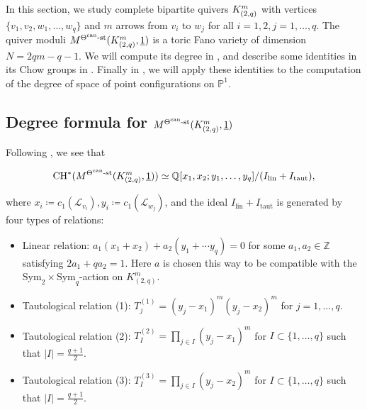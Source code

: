 \documentclass[11pt]{article}
\begin{document}
In this section, we study complete bipartite quivers \(K_{(2,q)}^m\) with vertices \(\{v_1, v_2, w_1, \dots, w_q\}\) and \(m\) arrows from \(v_i\) to \(w_j\) for all \(i = 1, 2, j = 1, \dots, q\). The quiver moduli \(M^{\Theta^{\text{can}}\text{-st}}(K_{(2,q)}^m, \underline{1})\) is a toric Fano variety of dimension \(N = 2qm - q - 1\). We will compute its degree in , and describe some identities in its Chow groups in . Finally in , we will apply these identities to the computation of the degree of space of point configurations on \(\mathbb{P}^1\). 

\subsection{Degree formula for \texorpdfstring{\(M^{\Theta^{\text{can}}\text{-st}}(K_{(2,q)}^m, \underline{1})\)}{M(K2qm, 1)}}\label{Subsection:4-1}

Following , we see that 

\[
\mathrm{CH}^*(M^{\Theta^{\text{can}}\text{-st}}(K_{(2,q)}^m, \underline{1}))\simeq \mathbb{Q}[x_1, x_2;y_1, \dots, y_q] / (I_{\text{lin}} + I_{\text{taut}}),
\]

where \(x_i\coloneqq c_1(\mathcal{L}_{v_i}), y_i\coloneqq c_1(\mathcal{L}_{w_j})\), and the ideal \(I_{\text{lin}} + I_{\text{taut}}\) is generated by four types of relations:

\begin{itemize}
    \itemsep=0pt
    \parskip=0pt
    \parsep=0pt
    
    \item Linear relation: \(a_1(x_1 + x_2) + a_2(y_1 + \cdots y_q) = 0\) for some \(a_1, a_2\in \mathbb{Z}\) satisfying \(2a_1 + qa_2 = 1\). Here \(a\) is chosen this way to be compatible with the \(\text{Sym}_2\times \text{Sym}_q\)-action on \(K_{(2,q)}^m\). 

    \item Tautological relation (1): \(T_j^{(1)} = (y_j - x_1)^m(y_j - x_2)^m\) for $j = 1, \dots, q$.

    \item Tautological relation (2): \(T_I^{(2)} = \prod\limits_{j\in I}(y_j - x_1)^m\) for \(I\subset \{1, \dots, q\}\) such that \(|I| = \frac{q + 1}{2}\). 

    \item Tautological relation (3): \( T_I^{(3)} = \prod\limits_{j\in I}(y_j - x_2)^m\) for \(I\subset \{1, \dots, q\}\) such that \(|I| = \frac{q + 1}{2}\). 
\end{itemize}
\end{document}
